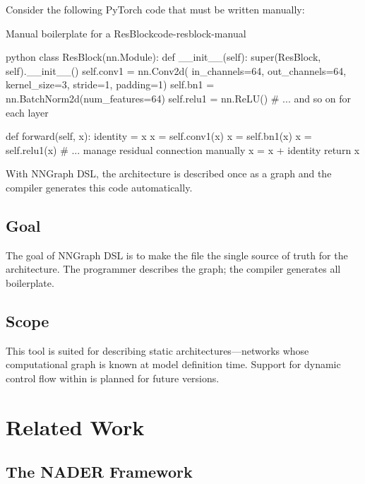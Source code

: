 \documentclass{nngraph-en}
\begin{document}
Consider the following PyTorch code that must be written manually:

\begin{codebox}{Manual boilerplate for a ResBlock}{code-resblock-manual}
\begin{amzcode}{python}
class ResBlock(nn.Module):
    def __init__(self):
        super(ResBlock, self).__init__()
        self.conv1 = nn.Conv2d(
            in_channels=64, out_channels=64,
            kernel_size=3, stride=1, padding=1)
        self.bn1   = nn.BatchNorm2d(num_features=64)
        self.relu1 = nn.ReLU()
        # ... and so on for each layer

    def forward(self, x):
        identity = x
        x = self.conv1(x)
        x = self.bn1(x)
        x = self.relu1(x)
        # ... manage residual connection manually
        x = x + identity
        return x
\end{amzcode}
\end{codebox}

With NNGraph DSL, the architecture is described once as a graph and
the compiler generates this code automatically.

\section{Goal}

The goal of NNGraph DSL is to make the  file the single
source of truth for the architecture. The programmer describes the
graph; the compiler generates all boilerplate.

\section{Scope}

This tool is suited for describing static architectures---networks
whose computational graph is known at model definition time.
Support for dynamic control flow within  is planned
for future versions.

\chapter{Related Work}

\section{The NADER Framework}
\end{document}
